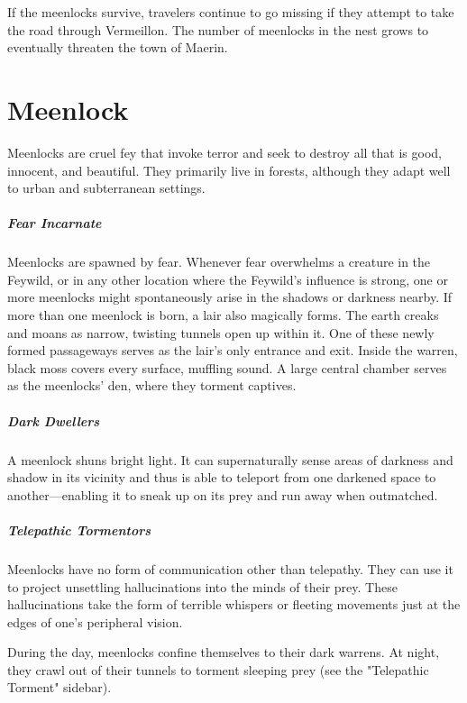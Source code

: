 \documentclass[10pt,a4paper,twoside,bg=print,twocolumn,openany,nodeprecatedcode]{dndbook}
\begin{document}
If the meenlocks survive, travelers continue to go missing if they attempt to take the road through Vermeillon. The number of meenlocks in the nest grows to eventually threaten the town of Maerin.

\section{Meenlock}
Meenlocks are cruel fey that invoke terror and seek to destroy all that is good, innocent, and beautiful. They primarily live in forests, although they adapt well to urban and subterranean settings.

\subparagraph{Fear Incarnate}
Meenlocks are spawned by fear. Whenever fear overwhelms a creature in the Feywild, or in any other location where the Feywild's influence is strong, one or more meenlocks might spontaneously arise in the shadows or darkness nearby. If more than one meenlock is born, a lair also magically forms. The earth creaks and moans as narrow, twisting tunnels open up within it. One of these newly formed passageways serves as the lair's only entrance and exit. Inside the warren, black moss covers every surface, muffling sound. A large central chamber serves as the meenlocks' den, where they torment captives.

\subparagraph{Dark Dwellers}
A meenlock shuns bright light. It can supernaturally sense areas of darkness and shadow in its vicinity and thus is able to teleport from one darkened space to another—enabling it to sneak up on its prey and run away when outmatched.

\subparagraph{Telepathic Tormentors}
Meenlocks have no form of communication other than telepathy. They can use it to project unsettling hallucinations into the minds of their prey. These hallucinations take the form of terrible whispers or fleeting movements just at the edges of one's peripheral vision.

During the day, meenlocks confine themselves to their dark warrens. At night, they crawl out of their tunnels to torment sleeping prey (see the "Telepathic Torment" sidebar).
\end{document}
